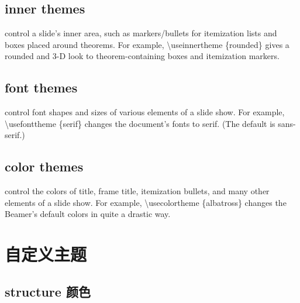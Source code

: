 \begin{column}{0.5\textwidth}
\subsection{inner themes}

control a slide’s inner area, such as markers/bullets for itemization lists and boxes placed around theorems. For example, {\ttfamily \textbackslash useinnertheme \{rounded\}} gives a rounded and 3-D look to theorem-containing boxes and itemization markers.

\subsection{font themes}

control font shapes and sizes of various elements of a slide show. For example, {\ttfamily \textbackslash usefonttheme \{serif\}} changes the document’s fonts to serif. (The default is sans-serif.)

\subsection{color themes}

control the colors of title, frame title, itemization bullets, and many other elements of a slide show. For example, {\ttfamily \textbackslash usecolortheme \{albatross\}} changes the Beamer’s default colors in quite a drastic way.

\section{自定义主题}

\subsection{{\ttfamily structure} 颜色}


\inputminted[linenos=true]{latex}{examples/beamer/beamertheme04.tex}


\end{column}
